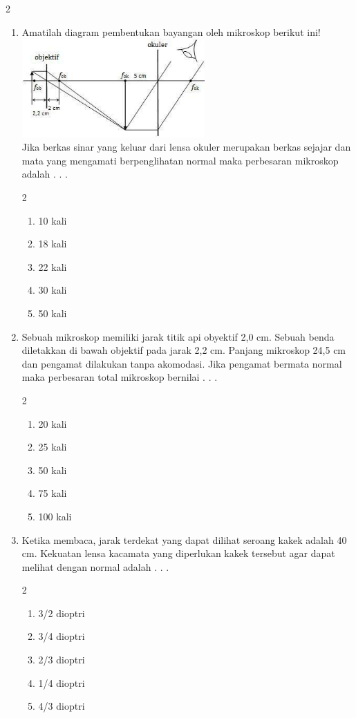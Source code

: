 \documentclass[10pt,a4paper]{extarticle}
\newcommand{\pilgani}[1]{                            \vspace{-0.3cm}\begin{multicols}{2}
 \begin{enumerate}[label=\Alph*., itemsep=0pt,topsep=0pt,leftmargin=*,align=Center]#1                     \end{enumerate}
 \phantom{ini cuma sapi, wedus, dan ayam}
 \end{multicols}}
\begin{document}
\begin{multicols*}{2}
\begin{enumerate}
\item Amatilah diagram pembentukan bayangan oleh mikroskop berikut ini!\\
\includegraphics[width=7cm]{pic/bayangan-mikroskop2}\\
Jika berkas sinar yang keluar dari lensa okuler merupakan berkas sejajar dan mata yang mengamati berpenglihatan normal maka perbesaran mikroskop adalah . . .
\pilgani{
	\item 10 kali
	\item 18 kali
	\item 22 kali
	\item 30 kali
	\item 50 kali}\vspace{3cm}


\item Sebuah mikroskop memiliki jarak titik api obyektif 2,0 cm. Sebuah benda diletakkan di bawah objektif pada jarak 2,2 cm. Panjang mikroskop 24,5 cm dan pengamat dilakukan tanpa akomodasi. Jika pengamat bermata normal maka perbesaran total mikroskop bernilai . . .
\pilgani{	
	\item 20 kali
	\item 25 kali
	\item 50 kali
	\item 75 kali
	\item 100 kali
}
\vspace{4cm}

\item Ketika membaca, jarak terdekat yang dapat dilihat seroang kakek adalah 40 cm. Kekuatan lensa kacamata yang diperlukan kakek tersebut agar dapat melihat dengan normal adalah . . .
\pilgani{
	\item 3/2 dioptri
	\item 3/4 dioptri
	\item 2/3 dioptri
	\item 1/4 dioptri
	\item 4/3 dioptri}
\vspace{3cm}


\end{enumerate}
\end{multicols*}
\end{document}
